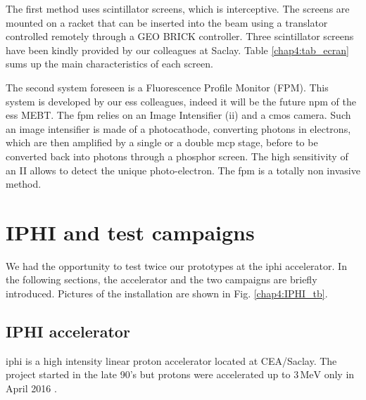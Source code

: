 \begin{refsection}
  The first method uses scintillator screens, which is interceptive. The screens are mounted on a racket that can be inserted into the beam using a translator controlled remotely through a GEO BRICK controller. Three scintillator screens have been kindly provided by our colleagues at Saclay. Table \ref{chap4:tab_ecran} sums up the main characteristics of each screen.

  

  The second system foreseen is a Fluorescence Profile Monitor (FPM). This system is developed by our \acrshort{ess} colleagues, indeed it will be the future \acrshort{npm} of the \acrshort{ess} MEBT. The \acrshort{fpm} relies on an Image Intensifier (\acrshort{ii}) and a \acrshort{cmos} camera.
  Such an image intensifier is made of a photocathode, converting photons in electrons, which are then amplified by a single or a double \acrshort{mcp} stage, before to be converted back into photons through a phosphor screen. The high sensitivity of an II allows to detect the unique photo-electron. The \acrshort{fpm} is a totally non invasive method.



  \section{IPHI and test campaigns}

  We had the opportunity to test twice our prototypes at the \acrshort{iphi} accelerator. In the following sections, the accelerator and the two campaigns are briefly introduced. Pictures of the installation are shown in Fig. \ref{chap4:IPHI_tb}.

  \subsection{IPHI accelerator}
  \acrshort{iphi} is a high intensity linear proton accelerator located at CEA/Saclay.
  The project started in the late 90's \cite{Beau2000} but protons were accelerated up to $3\,\mathrm{MeV}$ only in April 2016 \cite{Gobin2016}.


\end{refsection}

